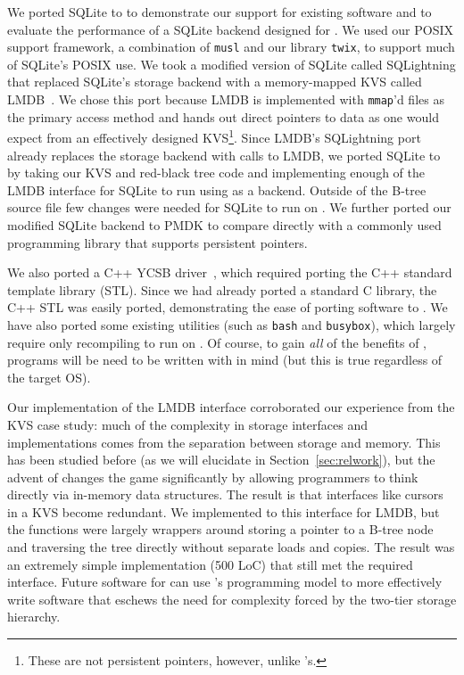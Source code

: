 {    We ported SQLite to \Twizzler to demonstrate our support for existing software and to evaluate the
    performance of a SQLite backend designed for \Twizzler. We used
    our POSIX support framework, a combination of \texttt{musl} and our library
    \texttt{twix}, to support much of SQLite's POSIX use.
    We took a modified version of SQLite called SQLightning that replaced
    SQLite's storage backend with a memory-mapped KVS called LMDB~\cite{lmdb}.
    We chose this port
    because LMDB is implemented with \texttt{mmap}'d files as the primary access method and hands out
    direct pointers to data as one would expect from an effectively designed \NVM KVS\footnote{These
        are not persistent pointers, however, unlike \Twizzler's.}.
    Since LMDB's SQLightning port already replaces the storage backend
    with calls to
    LMDB, we ported SQLite to \Twizzler by taking our KVS and red-black tree code and implementing
    enough of the LMDB interface for SQLite to run using \Twizzler as a backend.
    Outside of the
    B-tree source file few changes were needed for
    SQLite to run on \Twizzler. We further ported our modified SQLite backend to PMDK to compare
    directly with a commonly used \NVM programming library that supports persistent pointers.

    We also ported a C++ YCSB driver~\cite{ycsbc}, which required porting the C++ standard template
    library (STL). Since we had already ported a standard C library, the C++ STL was easily ported,
    demonstrating the ease of porting software to \Twizzler.
    We have also ported some existing \unix utilities (such as \texttt{bash} and
    \texttt{busybox}), which largely require only recompiling to run on \Twizzler. Of
    course, to gain \emph{all} of the benefits of \Twizzler, programs will be need to be
    written with \NVM in mind (but this is true regardless of the target OS).

    Our implementation of the LMDB interface
    corroborated our experience from the KVS case study: much of the complexity in storage interfaces
    and implementations comes from the separation between storage and memory. This has been
    studied before (as we will elucidate in Section~\ref{sec:relwork}), but the advent of \NVM changes the game
    significantly by allowing programmers to think directly via in-memory data structures. The result is
    that interfaces like cursors in a KVS become redundant. We implemented to this interface
    for LMDB, but the functions were largely wrappers around storing a pointer
    to a B-tree node and traversing the tree directly without separate loads and copies. The result was
    an extremely simple implementation (500 LoC) that still met the required interface. Future software
    for \NVM can use \Twizzler's programming model to more effectively write software
    that eschews the need for complexity forced by the two-tier storage hierarchy.

}

